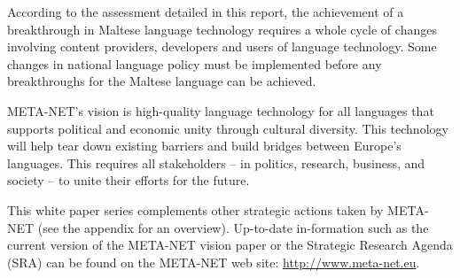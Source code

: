 \documentclass[]{../../metanetpaper}
\begin{document}
\begin{multicols}{2}
According to the assessment detailed in this report, the achievement of a breakthrough in Maltese language technology requires a whole cycle of changes involving content providers, developers and users of language technology. Some changes in national language policy must be implemented before any breakthroughs for the Maltese language can be achieved.

META-NET’s vision is high-quality language technology for all languages that supports political and economic unity through cultural diversity. This technology will help tear down existing barriers and build bridges between Europe’s languages. This requires all stakeholders -- in politics, research, business, and society -- to unite their efforts for the future.

This white paper series complements other strategic actions taken by META-NET (see the appendix for an overview). Up-to-date in-formation such as the current version of the META-NET vision paper \cite{Meta1}  or the Strategic Research Agenda (SRA) can be found on the META-NET web site: \url{http://www.meta-net.eu}.

\end{multicols}

\clearpage

\end{document}
